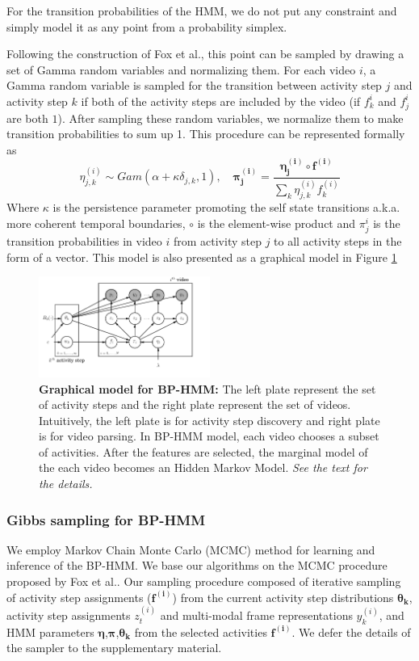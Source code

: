 For the transition probabilities of the HMM, we do not put any constraint and simply model it as any point from a probability simplex. 

Following the construction of Fox et al.\cite{foxBPHMM}, this point can be sampled by drawing a set of Gamma random variables and normalizing them. For each video $i$, a Gamma random variable is sampled for the transition between activity step $j$ and activity step $k$ if both of the activity steps are included by the video (\ie if $f^i_k$ and $f^i_j$ are both $1$). After sampling these random variables, we normalize them to make transition probabilities to sum up 1. This procedure can be represented formally as
\begin{equation}
  \eta_{j,k}^{(i)} \sim Gam(\alpha+\kappa \delta_{j,k},1), \quad \mathbf{\pi_j^{(i)}} = \frac{\mathbf{\eta^{(i)}_j} \circ \mathbf{f^{(i)}}}{\sum_k \eta^{(i)}_{j,k} f^{(i)}_k}
\end{equation}
Where $\kappa$ is the persistence parameter promoting the self state transitions a.k.a. more coherent temporal boundaries, $\circ$ is the element-wise product and $\pi^i_j$ is the transition probabilities in video $i$ from activity step $j$ to all activity steps in the form of a vector. This model is also presented as a graphical model in Figure \ref{bphmmo}
\begin{figure}[h!]
  \includegraphics[width=0.5\textwidth]{plate}
  \caption{\textbf{Graphical model for BP-HMM:} The left plate represent the set of activity steps and the right plate represent the set of videos. Intuitively, the left plate is for activity step discovery and right plate is for video parsing. In BP-HMM model, each video chooses a subset of activities. After the features are selected, the marginal model of the each video becomes an Hidden Markov Model. \emph{See the text for the details.}}
  \label{bphmmo}
\end{figure}


\subsubsection{Gibbs sampling for BP-HMM}
We employ Markov Chain Monte Carlo (MCMC) method for learning and inference of the BP-HMM. We base our algorithms on the MCMC procedure proposed by Fox et al.\cite{foxBPHMM}. Our sampling procedure composed of iterative sampling of activity step assignments ($\mathbf{f^{(i)}}$) from the current activity step distributions $\mathbf{\theta_k}$, activity step assignments $z^{(i)}_t$ and multi-modal frame representations $y^{(i)}_k$, and HMM parameters $\mathbf{\eta}$,$\mathbf{\pi}$,$\mathbf{\theta_k}$ from the selected activities $\mathbf{f^{(i)}}$. We defer the details of the sampler to the supplementary material.